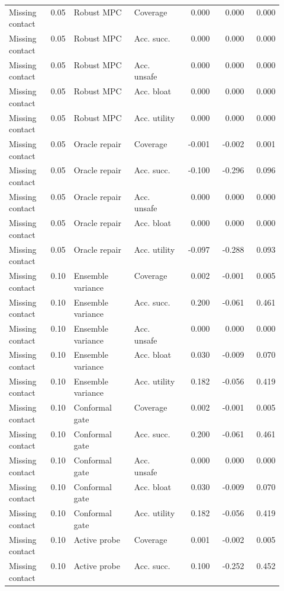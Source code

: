 \documentclass{article}
\begin{document}
\begin{center}
\begin{longtable}{p{0.14\linewidth}rp{0.22\linewidth}p{0.18\linewidth}rrr}
Missing contact & 0.05 & Robust MPC & Coverage & 0.000 & 0.000 & 0.000\\
Missing contact & 0.05 & Robust MPC & Acc. succ. & 0.000 & 0.000 & 0.000\\
Missing contact & 0.05 & Robust MPC & Acc. unsafe & 0.000 & 0.000 & 0.000\\
Missing contact & 0.05 & Robust MPC & Acc. bloat & 0.000 & 0.000 & 0.000\\
Missing contact & 0.05 & Robust MPC & Acc. utility & 0.000 & 0.000 & 0.000\\
Missing contact & 0.05 & Oracle repair & Coverage & -0.001 & -0.002 & 0.001\\
Missing contact & 0.05 & Oracle repair & Acc. succ. & -0.100 & -0.296 & 0.096\\
Missing contact & 0.05 & Oracle repair & Acc. unsafe & 0.000 & 0.000 & 0.000\\
Missing contact & 0.05 & Oracle repair & Acc. bloat & 0.000 & 0.000 & 0.000\\
Missing contact & 0.05 & Oracle repair & Acc. utility & -0.097 & -0.288 & 0.093\\
Missing contact & 0.10 & Ensemble variance & Coverage & 0.002 & -0.001 & 0.005\\
Missing contact & 0.10 & Ensemble variance & Acc. succ. & 0.200 & -0.061 & 0.461\\
Missing contact & 0.10 & Ensemble variance & Acc. unsafe & 0.000 & 0.000 & 0.000\\
Missing contact & 0.10 & Ensemble variance & Acc. bloat & 0.030 & -0.009 & 0.070\\
Missing contact & 0.10 & Ensemble variance & Acc. utility & 0.182 & -0.056 & 0.419\\
Missing contact & 0.10 & Conformal gate & Coverage & 0.002 & -0.001 & 0.005\\
Missing contact & 0.10 & Conformal gate & Acc. succ. & 0.200 & -0.061 & 0.461\\
Missing contact & 0.10 & Conformal gate & Acc. unsafe & 0.000 & 0.000 & 0.000\\
Missing contact & 0.10 & Conformal gate & Acc. bloat & 0.030 & -0.009 & 0.070\\
Missing contact & 0.10 & Conformal gate & Acc. utility & 0.182 & -0.056 & 0.419\\
Missing contact & 0.10 & Active probe & Coverage & 0.001 & -0.002 & 0.005\\
Missing contact & 0.10 & Active probe & Acc. succ. & 0.100 & -0.252 & 0.452\\

\end{longtable}
\end{center}
\end{document}
